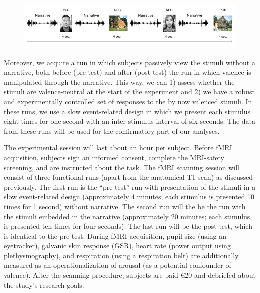 \documentclass[12pt,a4paper]{article}\usepackage[]{graphicx}\usepackage[]{color}
\begin{document}
\begin{figure}[h]
\centering
\includegraphics[scale=.55]{exp_paradigm}
\end{figure}

Moreover, we acquire a run in which subjects passively view the stimuli without a narrative, both before (pre-test) and after (post-test) the run in which valence is manipulated through the narrative. This way, we can 1) assess whether the stimuli are valence-neutral at the start of the experiment and 2) we have a robust and experimentally controlled set of responses to the by now valenced stimuli. In these runs, we use a slow event-related design in which we present each stimulus eight times for one second with an inter-stimulus interval of six seconds. The data from these runs will be used for the confirmatory part of our analyses. 

The experimental session will last about an hour per subject. Before fMRI acquisition, subjects sign an informed consent, complete the MRI-safety screening, and are instructed about the task. The fMRI scanning session will consist of three functional runs (apart from the anatomical T1 scan) as discussed previously. The first run is the ``pre-test'' run with presentation of the stimuli in a slow event-related design (approximately 4 minutes; each stimulus is presented 10 times for 1 second) without narrative. The second run will the be the run with the stimuli embedded in the narrative (approximately 20 minutes; each stimulus is presented ten times for four seconds). The last run will be the post-test, which is identical to the pre-test. During fMRI acquisition, pupil size (using an eyetracker), galvanic skin response (GSR), heart rate (power output using plethysmography), and respiration (using a respiration belt) are additionally measured as an operationalization of arousal (as a potential confounder of valence). After the scanning procedure, subjects are paid \euro 20 and debriefed about the study's research goals. 
\end{document}
